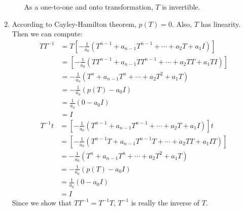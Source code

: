 \begin{homeworkProblem}
\begin{enumerate}
\begin{enumerate}
  As a one-to-one and onto transformation, $T$ is invertible.
  \end{enumerate}
  \item According to Cayley-Hamilton theorem, $p(T) = 0$. Also, $T$ has linearity. Then we can compute:
  \[
    \begin{aligned}
      TT^{-1} &= T\left[
        -\frac{1}{a_0}(T^{n-1}+a_{n-1}T^{n-1}+\cdots+a_2T + a_1I)
      \right]\\
      &= \left[
        -\frac{1}{a_0}(TT^{n-1}+a_{n-1}TT^{n-1}+\cdots+a_2TT + a_1TI)
      \right]\\
      &= -\frac{1}{a_0}(T^{n}+a_{n-1}T^{n}+\cdots+a_2T^2 + a_1T)\\
      &= -\frac{1}{a_0}(p(T) - a_0 I)\\
      &= \frac{1}{a_0}(0 - a_0 I)\\
      &= I
    \end{aligned}
  \]
  \[
    \begin{aligned}
      T^{-1}t &= \left[
        -\frac{1}{a_0}(T^{n-1}+a_{n-1}T^{n-1}+\cdots+a_2T + a_1I)
      \right]t\\
      &= \left[
        -\frac{1}{a_0}(T^{n-1}T+a_{n-1}T^{n-1}T+\cdots+a_2TT + a_1IT)
      \right]\\
      &= -\frac{1}{a_0}(T^{n}+a_{n-1}T^{n}+\cdots+a_2T^2 + a_1T)\\
      &= -\frac{1}{a_0}(p(T) - a_0 I)\\
      &= \frac{1}{a_0}(0 - a_0 I)\\
      &= I
    \end{aligned}
  \]
  Since we show that $TT^{-1} = T^{-1}T$, $T^{-1}$ is really the inverse of $T$.
\end{enumerate}
\end{homeworkProblem}
